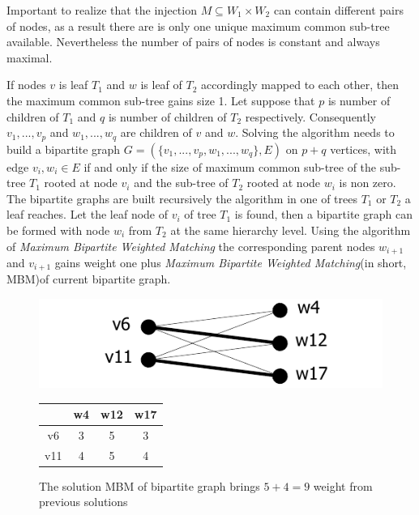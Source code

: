 \documentclass{report}
\begin{document}
Important to realize that the injection $M \subseteq W_{1} \times  W_{2}$ can contain different pairs of nodes, as a result there are is only one unique maximum common sub-tree available. Nevertheless the number of pairs of nodes is constant and always maximal.

If nodes $v$ is leaf $ T_{1}$ and $w$ is leaf of $T_{2 }$ accordingly mapped to each other, then the maximum common sub-tree gains size 1. Let suppose that $p$ is number of children of $ T_{1}$ and $q$ is number of children of $ T_{2}$ respectively. Consequently $ v_{1},...,v_{p}$ and $ w_{1},...,w_{q}$ are children of 
 $v$  and $w$\cite{valiente}. Solving the algorithm needs to build a bipartite graph $G=(\{v_{1},...,v_{p}, w_{1},...,w_{q} \}, E)$ on $p+q$ vertices, with edge 
$ v_{i},w_{i} \in E$  if and only if the size of maximum common sub-tree of the sub-tree $ T_{1}$ rooted at node $ v_{i}$ and the sub-tree of $T_{2 }$ rooted at node $ w_{i}$ is non zero\cite{valiente}. 
The bipartite graphs are built recursively the algorithm in one of trees $ T_{1}$ or $ T_{2}$ a leaf reaches. Let the leaf node of $ v_{i}$ of tree $ T_{1}$ is found, then a bipartite graph can be formed with node $ w_{i}$ from $ T_{2}$ at the same hierarchy level. Using the algorithm of \emph{Maximum Bipartite Weighted Matching} the corresponding parent nodes $ w_{i+1}$ and $ v_{i+1}$ gains weight one plus \emph{Maximum Bipartite Weighted Matching}(in short, MBM)of current bipartite graph.

\begin{figure}
  \begin{minipage}[h]{0.60\linewidth}
    \centering
    \includegraphics[scale=0.95]{Figures/algorithms/TD/1ex.pdf}\\[0.1cm]
    
  \end{minipage}%
  \begin{minipage}[b]{0.30\linewidth}
    \centering
\begin{tabular}{|c|c|c|c|}
\hline
    & w4 & w12                       & w17                       \\ \hline
v6  & 3  & \cellcolor[gray]{0.9} 5 & 3                         \\ \hline
v11 & 4  & 5                         & \cellcolor[gray]{0.9}4 \\ \hline
\end{tabular}
\end{minipage}
\caption{The solution MBM of bipartite graph brings $5+4=9$ weight from previous solutions}
\label{fig:ex1}
\end{figure}
\end{document}
